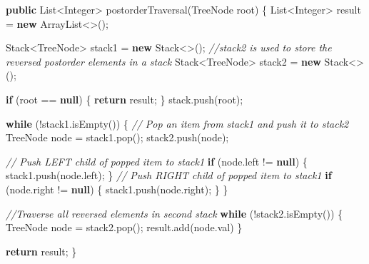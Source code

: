 \documentclass[]{book}
\newenvironment{Shaded}{\begin{snugshade}}{\end{snugshade}}
\newcommand{\BuiltInTok}[1]{#1}
\newcommand{\CommentTok}[1]{\textcolor[rgb]{0.56,0.35,0.01}{\textit{#1}}}
\newcommand{\FunctionTok}[1]{\textcolor[rgb]{0.00,0.00,0.00}{#1}}
\newcommand{\KeywordTok}[1]{\textcolor[rgb]{0.13,0.29,0.53}{\textbf{#1}}}
\newcommand{\NormalTok}[1]{#1}
\begin{document}
\begin{Shaded}
\begin{Highlighting}[]
\KeywordTok{public} \BuiltInTok{List}\NormalTok{<}\BuiltInTok{Integer}\NormalTok{> }\FunctionTok{postorderTraversal}\NormalTok{(}\BuiltInTok{TreeNode}\NormalTok{ root) \{}
    \BuiltInTok{List}\NormalTok{<}\BuiltInTok{Integer}\NormalTok{> result = }\KeywordTok{new} \BuiltInTok{ArrayList}\NormalTok{<>();}

    \BuiltInTok{Stack}\NormalTok{<}\BuiltInTok{TreeNode}\NormalTok{> stack1 = }\KeywordTok{new} \BuiltInTok{Stack}\NormalTok{<>();}
    \CommentTok{//stack2 is used to store the reversed postorder elements in a stack}
    \BuiltInTok{Stack}\NormalTok{<}\BuiltInTok{TreeNode}\NormalTok{> stack2 = }\KeywordTok{new} \BuiltInTok{Stack}\NormalTok{<>();}

    \KeywordTok{if}\NormalTok{ (root == }\KeywordTok{null}\NormalTok{) \{}
        \KeywordTok{return}\NormalTok{ result;}
\NormalTok{    \}}
\NormalTok{    stack.}\FunctionTok{push}\NormalTok{(root);}

    \KeywordTok{while}\NormalTok{ (!stack1.}\FunctionTok{isEmpty}\NormalTok{()) \{}
        \CommentTok{// Pop an item from stack1 and push it to stack2}
        \BuiltInTok{TreeNode}\NormalTok{ node = stack1.}\FunctionTok{pop}\NormalTok{();}
\NormalTok{        stack2.}\FunctionTok{push}\NormalTok{(node);}

        \CommentTok{// Push LEFT child of popped item to stack1}
        \KeywordTok{if}\NormalTok{ (node.}\FunctionTok{left}\NormalTok{ != }\KeywordTok{null}\NormalTok{) \{}
\NormalTok{            stack1.}\FunctionTok{push}\NormalTok{(node.}\FunctionTok{left}\NormalTok{);}
\NormalTok{        \}}
        \CommentTok{// Push RIGHT child of popped item to stack1}
        \KeywordTok{if}\NormalTok{ (node.}\FunctionTok{right}\NormalTok{ != }\KeywordTok{null}\NormalTok{) \{}
\NormalTok{            stack1.}\FunctionTok{push}\NormalTok{(node.}\FunctionTok{right}\NormalTok{);}
\NormalTok{        \}}
\NormalTok{    \}}

    \CommentTok{//Traverse all reversed elements in second stack}
    \KeywordTok{while}\NormalTok{ (!stack2.}\FunctionTok{isEmpty}\NormalTok{()) \{}
        \BuiltInTok{TreeNode}\NormalTok{ node = stack2.}\FunctionTok{pop}\NormalTok{();}
\NormalTok{        result.}\FunctionTok{add}\NormalTok{(node.}\FunctionTok{val}\NormalTok{)}
\NormalTok{    \}}

    \KeywordTok{return}\NormalTok{ result;}
\NormalTok{    \}}
\end{Highlighting}
\end{Shaded}
\end{document}
